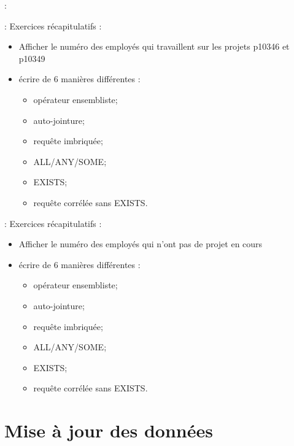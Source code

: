\documentclass[10pt]{beamer}
\begin{document}
\begin{frame}{\secname : \subsecname}
    
\end{frame}
\begin{frame}{\secname : \subsecname}
    Exercices récapitulatifs :
    \begin{itemize}
        \item Afficher le numéro des employés qui travaillent sur les projets p10346 et p10349
        \item écrire de 6 manières différentes :
              \begin{itemize}
                  \item opérateur ensembliste;
                  \item auto-jointure;
                  \item requête imbriquée;
                  \item ALL/ANY/SOME;
                  \item EXISTS;
                  \item requête corrélée sans EXISTS.
              \end{itemize}
    \end{itemize}
\end{frame}

\begin{frame}{\secname : \subsecname}
    Exercices récapitulatifs :
    \begin{itemize}
        \item Afficher le numéro des employés qui n'ont pas de projet en cours
        \item écrire de 6 manières différentes :
              \begin{itemize}
                  \item opérateur ensembliste;
                  \item auto-jointure;
                  \item requête imbriquée;
                  \item ALL/ANY/SOME;
                  \item EXISTS;
                  \item requête corrélée sans EXISTS.
              \end{itemize}
    \end{itemize}
\end{frame}
\section{Mise à jour des données}
\tocss
\end{document}
